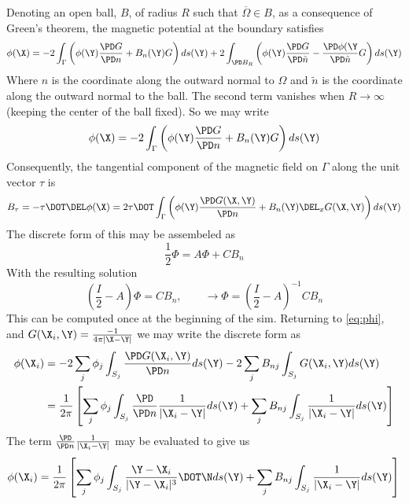 \documentclass[11pt]{article}
\begin{document}
Denoting an open ball, $B$, of radius $R$ such that $\overline{\Omega}\in B$, as a consequence of Green's theorem, the magnetic potential at the boundary satisfies
\begin{equation}
  \phi(\X) =
  -2 \int_{\Gamma} \left( \phi(\Y)
  \frac{\PD G}{\PD n} + B_n(\Y) G \right) ds(\Y)
  +2 \int_{\PD B_R} \left( \phi(\Y)
  \frac{\PD G}{\PD \tilde{n}} - \frac{\PD \phi(\Y}{\PD \tilde{n}} G \right) ds(\Y)
\end{equation}
Where $n$ is the coordinate along the outward normal to $\Omega$ and $\tilde{n}$ is the coordinate along the outward normal to the ball. The second term vanishes when $R\rightarrow \infty$ (keeping the center of the ball fixed). So we may write
\begin{equation} \label{eq:phi}
  \phi(\X) =
  -2 \int_{\Gamma} \left( \phi(\Y)
  \frac{\PD G}{\PD n} + B_n(\Y) G \right) ds(\Y)
\end{equation}
Consequently, the tangential component of the magnetic field on $\Gamma$ along the unit vector $\tau$ is
\begin{equation}
  B_{\tau} = - \mathbf{\tau} \DOT \DEL \phi(\X) =
  2 \mathbf{\tau} \DOT
  \int_{\Gamma}
  \left(
  \phi(\Y) \frac{\PD G(\X,\Y)}{\PD n}
  + B_n(\Y) \DEL_x G(\X,\Y)
  \right) ds(\Y)
\end{equation}
The discrete form of this may be assembeled as
\begin{equation}
  \frac{1}{2} \Phi = A \Phi + C B_n
\end{equation}
With the resulting solution
\begin{equation}
  \left(\frac{I}{2} - A\right)\Phi = C B_n, \qquad
  \rightarrow
  \Phi = \left(\frac{I}{2} - A\right)^{-1} C B_n
\end{equation}
This can be computed once at the beginning of the sim. Returning to \ref{eq:phi}, and $G(\X_i,\Y) = \frac{-1}{4\pi |\X - \Y|}$ we may write the discrete form as
\begin{equation}
\begin{split}
\phi(\X_i) & = -2 \sum_j \phi_j \int_{S_j} \frac{\PD G(\X_i,\Y)}{\PD n} ds(\Y)
           -2 \sum_j B_{nj} \int_{S_j} G(\X_i,\Y) ds(\Y) \\
       & = \frac{1}{2 \pi}
       \left[
       \sum_j \phi_j \int_{S_j} \frac{\PD}{\PD n} \frac{1}{|\X_i-\Y|} ds(\Y)
     + \sum_j B_{nj} \int_{S_j} \frac{1}{|\X_i-\Y|} ds(\Y)
       \right] \\
\end{split}
\end{equation}
The term $\frac{\PD}{\PD n} \frac{1}{|\X_i-\Y|} $ may be evaluated to give us
\begin{equation}
\phi(\X_i) = \frac{1}{2 \pi}
       \left[
       \sum_j \phi_j \int_{S_j} \frac{\Y - \X_i}{| \Y - \X_i|^3} \DOT \N ds(\Y)
     + \sum_j B_{nj} \int_{S_j} \frac{1}{|\X_i-\Y|} ds(\Y)
       \right] \\
\end{equation}


\end{document}
